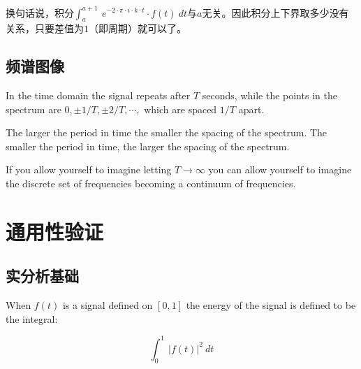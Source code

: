 换句话说，积分$\int_{a}^{a+1}\ e^{-2\cdot \pi\cdot i\cdot k\cdot t}\cdot f(t)\ dt$与$a$无关。因此积分上下界取多少没有关系，只要差值为$1$（即周期）就可以了。
\subsection{频谱图像}
In the time domain the signal repeats after $T$ seconds, while the points in the spectrum are $0, \pm 1/T, \pm 2/T,\cdots ,$ which are spaced $1/T$ apart.

The larger the period in time the smaller the spacing of the spectrum. The smaller the period in time, the larger the spacing of the spectrum.

If you allow yourself to imagine letting $T\rightarrow\infty$ you can allow yourself to imagine the discrete set of frequencies becoming a continuum of frequencies.
\section{通用性验证}
\subsection{实分析基础}
When $f(t)$ is a signal defined on $[0,1]$ the energy of the signal is defined to be the integral:

\begin{equation}
	\int_0^1\ |f(t)|^2\ dt
\end{equation}

